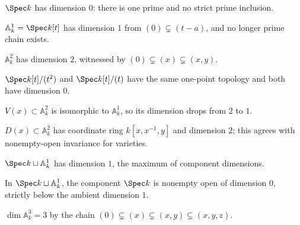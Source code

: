 \begin{example}[A point]\label{ex:vi30-01}
$\Spec k$ has dimension $0$: there is one prime and no strict prime inclusion.
\end{example}

\begin{example}\label{ex:vi30-02}
$\mathbb A^1_k=\Spec k[t]$ has dimension $1$ from $(0)\subsetneq(t-a)$, and no longer prime chain exists.
\end{example}

\begin{example}\label{ex:vi30-03}
$\mathbb A^2_k$ has dimension $2$, witnessed by $(0)\subsetneq(x)\subsetneq(x,y)$.
\end{example}

\begin{example}[Reduction]\label{ex:vi30-04}
$\Spec k[t]/(t^2)$ and $\Spec k[t]/(t)$ have the same one-point topology and both have dimension $0$.
\end{example}

\begin{example}\label{ex:vi30-05}
$V(x)\subset\mathbb A^2_k$ is isomorphic to $\mathbb A^1_k$, so its dimension drops from $2$ to $1$.
\end{example}

\begin{example}\label{ex:vi30-06}
$D(x)\subset\mathbb A^2_k$ has coordinate ring $k[x,x^{-1},y]$ and dimension $2$; this agrees with nonempty-open invariance for varieties.
\end{example}

\begin{example}\label{ex:vi30-07}
$\Spec k\sqcup\mathbb A^1_k$ has dimension $1$, the maximum of component dimensions.
\end{example}

\begin{example}\label{ex:vi30-08}
In $\Spec k\sqcup\mathbb A^1_k$, the component $\Spec k$ is nonempty open of dimension $0$, strictly below the ambient dimension $1$.
\end{example}

\begin{example}\label{ex:vi30-09}
$\dim\mathbb A^3_k=3$ by the chain $(0)\subsetneq(x)\subsetneq(x,y)\subsetneq(x,y,z)$.
\end{example}

